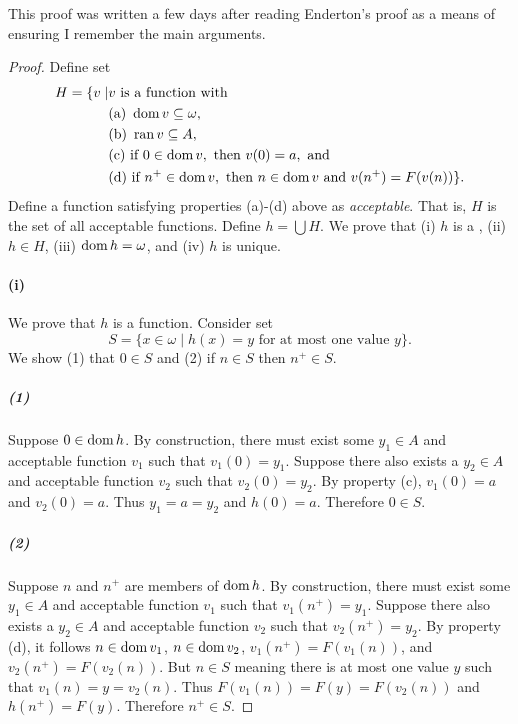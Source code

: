\documentclass{report}
\begin{document}
\begin{note}
  This proof was written a few days after reading Enderton's proof as a means of
  ensuring I remember the main arguments.
\end{note}

\begin{proof}

  Define set
    \begin{align*}
      H = \{ v \mid & v \text{ is a function with } \\
        & \text{(a) } \mathop{\text{dom}}{v} \subseteq \omega, \\
        & \text{(b) } \mathop{\text{ran}}{v} \subseteq A, \\
        & \text{(c) if } 0 \in \mathop{\text{dom}}{v}, \text{ then } v(0) = a, \text{ and} \\
        & \text{(d) if } n^+ \in \mathop{\text{dom}}{v},
          \text{ then } n \in \mathop{\text{dom}}{v} \text{ and } v(n^+) = F(v(n))
      \}.
    \end{align*}
  Define a function satisfying properties (a)-(d) above as \textit{acceptable}.
  That is, $H$ is the set of all acceptable functions.
  Define $h = \bigcup H$.
  We prove that (i) $h$ is a , (ii) $h \in H$, (iii)
    $\mathop{\text{dom}}{h} = \omega$, and (iv) $h$ is unique.

  \paragraph{(i)}%

    We prove that $h$ is a function.
    Consider set
      $$S = \{x \in \omega \mid h(x) = y \text{ for at most one value } y\}.$$
    We show (1) that $0 \in S$ and (2) if $n \in S$ then $n^+ \in S$.

    \subparagraph{(1)}%

      Suppose $0 \in \mathop{\text{dom}}{h}$.
      By construction, there must exist some $y_1 \in A$ and acceptable function
        $v_1$ such that $v_1(0) = y_1$.
      Suppose there also exists a $y_2 \in A$ and acceptable function $v_2$ such
        that $v_2(0) = y_2$.
      By property (c), $v_1(0) = a$ and $v_2(0) = a$.
      Thus $y_1 = a = y_2$ and $h(0) = a$.
      Therefore $0 \in S$.

    \subparagraph{(2)}%

      Suppose $n$ and $n^+$ are members of $\mathop{\text{dom}}{h}$.
      By construction, there must exist some $y_1 \in A$ and acceptable function
        $v_1$ such that $v_1(n^+) = y_1$.
      Suppose there also exists a $y_2 \in A$ and acceptable function $v_2$ such
        that $v_2(n^+) = y_2$.
      By property (d), it follows $n \in \mathop{\text{dom}}{v_1}$, $n \in \mathop{\text{dom}}{v_2}$,
        $v_1(n^+) = F(v_1(n))$, and $v_2(n^+) = F(v_2(n))$.
      But $n \in S$ meaning there is at most one value $y$ such that
        $v_1(n) = y = v_2(n)$.
      Thus $F(v_1(n)) = F(y) = F(v_2(n))$ and $h(n^+) = F(y)$.
      Therefore $n^+ \in S$.


\end{proof}
\end{document}

